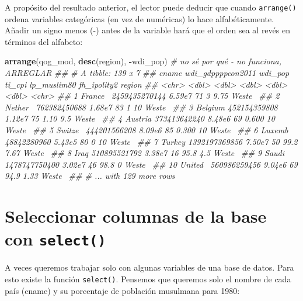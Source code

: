 \documentclass[]{book}
\newenvironment{Shaded}{\begin{snugshade}}{\end{snugshade}}
\newcommand{\CommentTok}[1]{\textcolor[rgb]{0.56,0.35,0.01}{\textit{#1}}}
\newcommand{\KeywordTok}[1]{\textcolor[rgb]{0.13,0.29,0.53}{\textbf{#1}}}
\newcommand{\NormalTok}[1]{#1}
\newcommand{\OperatorTok}[1]{\textcolor[rgb]{0.81,0.36,0.00}{\textbf{#1}}}
\begin{document}
A propósito del resultado anterior, el lector puede deducir que cuando
\texttt{arrange()} ordena variables categóricas (en vez de numéricas) lo
hace alfabéticamente. Añadir un signo menos (-) antes de la variable
hará que el orden sea al revés en términos del alfabeto:

\begin{Shaded}
\begin{Highlighting}[]
\KeywordTok{arrange}\NormalTok{(qog_mod, }\KeywordTok{desc}\NormalTok{(region), }\OperatorTok{-}\NormalTok{wdi_pop) }\CommentTok{# no sé por qué - no funciona, ARREGLAR}
\CommentTok{## # A tibble: 139 x 7}
\CommentTok{##    cname   wdi_gdppppcon2011 wdi_pop ti_cpi lp_muslim80 fh_ipolity2 region}
\CommentTok{##    <chr>               <dbl>   <dbl>  <dbl>       <dbl>       <dbl> <chr> }
\CommentTok{##  1 France~     2459435270144  6.59e7     71       3            9.75 Weste~}
\CommentTok{##  2 Nether~      762382450688  1.68e7     83       1           10    Weste~}
\CommentTok{##  3 Belgium      452154359808  1.12e7     75       1.10         9.5  Weste~}
\CommentTok{##  4 Austria      373413642240  8.48e6     69       0.600       10    Weste~}
\CommentTok{##  5 Switze~      444201566208  8.09e6     85       0.300       10    Weste~}
\CommentTok{##  6 Luxemb~       48842280960  5.43e5     80       0           10    Weste~}
\CommentTok{##  7 Turkey      1392197369856  7.50e7     50      99.2          7.67 Weste~}
\CommentTok{##  8 Iraq         510895521792  3.38e7     16      95.8          4.5  Weste~}
\CommentTok{##  9 Saudi ~     1478747750400  3.02e7     46      98.8          0    Weste~}
\CommentTok{## 10 United~      560986259456  9.04e6     69      94.9          1.33 Weste~}
\CommentTok{## # ... with 129 more rows}
\end{Highlighting}
\end{Shaded}

\hypertarget{seleccionar-columnas-de-la-base-con-select}{%
\section{\texorpdfstring{Seleccionar columnas de la base con
\texttt{select()}}{Seleccionar columnas de la base con select()}}\label{seleccionar-columnas-de-la-base-con-select}}

A veces queremos trabajar solo con algunas variables de una base de
datos. Para esto existe la función \texttt{select()}. Pensemos que
queremos solo el nombre de cada país (cname) y su porcentaje de
población musulmana para 1980:
\end{document}
